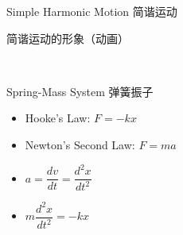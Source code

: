 \documentclass{beamer}
\begin{document}
\begin{frame}{Simple Harmonic Motion 简谐运动}
	\begin{block}{简谐运动的形象（动画）}
		\begin{center}
		\href{run:./LectureNotePics/vertoscillator.gif}{}\\
		\end{center}
	\end{block}
\end{frame}

\begin{frame}{Spring-Mass System 弹簧振子}
	\begin{center}
	\end{center}
	\begin{itemize}
		\item Hooke's Law: $F = -kx$
		\item Newton's Second Law: $F = ma$
		\item $a = \dfrac{dv}{dt} = \dfrac{d^2 x}{dt^2}$
		\item $m\dfrac{d^2 x}{dt^2} = -kx$
	\end{itemize}
\end{frame}
\end{document}
